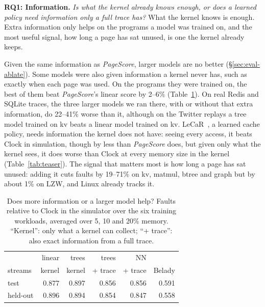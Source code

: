 \documentclass{article}
\newcommand{\clock}{Clock\xspace}
\newcommand{\belady}{Belady\xspace}
\DeclareRobustCommand{\pagescore}{\textit{PageScore}}
\newcommand{\rqbox}[3]{\par\smallskip\noindent\textbf{#1.} \emph{#2} #3\par}
\begin{document}
\rqbox{RQ1: Information}{Is what the kernel already knows enough, or does a learned policy need information only a full trace has?}{What the kernel knows is enough. Extra information only helps on the programs a model was trained on, and the most useful signal, how long a page has sat unused, is one the kernel already keeps.}\label{sec:eval-info}

Given the same information as \pagescore{}, larger models are no better (\S\ref{sec:eval-ablate}). Some models were also given information a kernel never has, such as exactly when each page was used. On the programs they were trained on, the best of them beat \pagescore{}'s linear score by 2--6\% (Table~\ref{tab:info-main}). On real Redis and SQLite traces, the three larger models we ran there, with or without that extra information, do 22--41\% worse than it, although on the Twitter replays a tree model trained on kv beats a linear model trained on kv. LeCaR~\citep{vietri2018lecar}, a learned cache policy, needs information the kernel does not have: seeing every access, it beats \clock in simulation, though by less than \pagescore{} does, but given only what the kernel sees, it does worse than \clock at every memory size in the kernel (Table~\ref{tab:teaser}). The signal that matters most is how long a page has sat unused: adding it cuts faults by 19--71\% on kv, matmul, btree and graph but by about 1\% on LZW, and Linux already tracks it.

\begin{table}[t]
\caption{Does more information or a larger model help? Faults relative to \clock in the simulator over the six training workloads, averaged over 5, 10 and 20\% memory. ``Kernel'': only what a kernel can collect; ``+ trace'': also exact information from a full trace.}
\label{tab:info-main}
\vskip 0.05in
\begin{center}
\begin{footnotesize}
\setlength{\tabcolsep}{3pt}
\begin{tabular}{@{}lrrrrr@{}}
\toprule
 & linear & trees & trees & NN & \\
streams & kernel & kernel & + trace & + trace & \belady \\
\midrule
test     & 0.877 & 0.897 & 0.856 & 0.856 & 0.591 \\
held-out & 0.896 & 0.894 & 0.854 & 0.847 & 0.558 \\
\bottomrule
\end{tabular}
\end{footnotesize}
\end{center}
\vskip -0.1in
\end{table}
\end{document}
